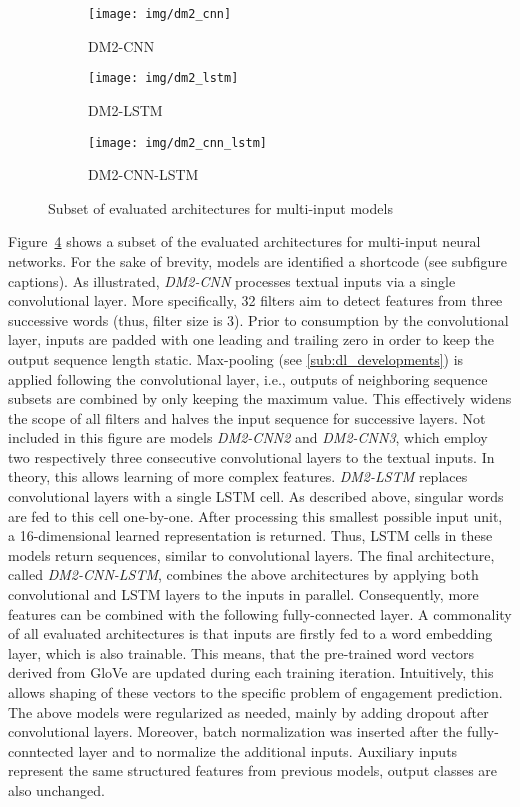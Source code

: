 \begin{figure}[h]
\begin{subfigure}{.5\textwidth}
  \texttt{[image: img/dm2\_cnn]}
  \caption{DM2-CNN}
  \label{fig:dm2_cnn}
\end{subfigure}%
\begin{subfigure}{.5\textwidth}
  \texttt{[image: img/dm2\_lstm]}
  \caption{DM2-LSTM}
  \label{fig:dm2_lstm}
\end{subfigure}
\begin{subfigure}{.7\textwidth}
  \texttt{[image: img/dm2\_cnn\_lstm]}
  \caption{DM2-CNN-LSTM}
  \label{fig:dm2_cnn_lstm}
\end{subfigure}
\caption{Subset of evaluated architectures for multi-input models}
\label{fig:dm2_architectures}
\end{figure}

Figure~\ref{fig:dm2_architectures} shows a subset of the evaluated architectures for
multi-input neural networks.
For the sake of brevity, models are identified a shortcode (see subfigure captions).
As illustrated, \textit{DM2-CNN} processes textual inputs via a single convolutional
layer.
More specifically, 32 filters aim to detect features from three successive words
(thus, filter size is 3).
Prior to consumption by the convolutional layer, inputs are padded with one leading
and trailing zero in order to keep the output sequence length static.
Max-pooling (see \ref{sub:dl_developments}) is applied following the convolutional layer,
i.e., outputs of neighboring sequence subsets are combined by only keeping the
maximum value.
This effectively widens the scope of all filters and halves the input sequence
for successive layers.
Not included in this figure are models \textit{DM2-CNN2} and \textit{DM2-CNN3},
which employ two respectively three consecutive convolutional layers to the
textual inputs.
In theory, this allows learning of more complex features.
\textit{DM2-LSTM} replaces convolutional layers with a single LSTM cell.
As described above, singular words are fed to this cell one-by-one.
After processing this smallest possible input unit, a 16-dimensional learned
representation is returned.
Thus, LSTM cells in these models return sequences, similar to convolutional layers.
The final architecture, called \textit{DM2-CNN-LSTM}, combines the above
architectures by applying both convolutional and LSTM layers to the inputs
in parallel.
Consequently, more features can be combined with the following fully-connected
layer.
A commonality of all evaluated architectures is that inputs are firstly fed to
a word embedding layer, which is also trainable.
This means, that the pre-trained word vectors derived from GloVe are updated
during each training iteration.
Intuitively, this allows shaping of these vectors to the specific problem of
engagement prediction.
The above models were regularized as needed, mainly by adding dropout after
convolutional layers.
Moreover, batch normalization was inserted after the fully-conntected layer and
to normalize the additional inputs.
Auxiliary inputs represent the same structured features from previous models,
output classes are also unchanged.

